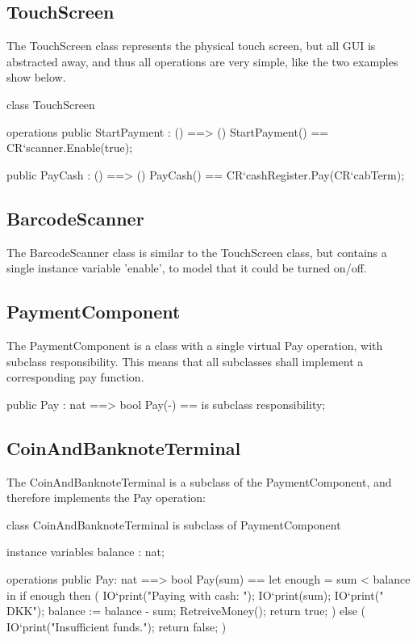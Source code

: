 \subsection{TouchScreen}
The TouchScreen class represents the physical touch screen, but all GUI is abstracted away, and thus all operations are very simple, like the two examples show below.
\begin{vdmpp}
class TouchScreen

operations
 public StartPayment : () ==> ()
 StartPayment() ==
  CR`scanner.Enable(true);

 public PayCash : () ==> ()
 PayCash() ==
  CR`cashRegister.Pay(CR`cabTerm);
 \end{vdmpp}

\subsection{BarcodeScanner}
The BarcodeScanner class is similar to the TouchScreen class, but contains a single instance variable 'enable', to model that it could be turned on/off.


\subsection{PaymentComponent}
The PaymentComponent is a class with a single virtual Pay operation, with subclass responsibility. This means that all subclasses shall implement a corresponding pay function.
\begin{vdmpp}
public Pay : nat ==> bool
Pay(-) == is subclass responsibility;
\end{vdmpp}

\subsection{CoinAndBanknoteTerminal}
The CoinAndBanknoteTerminal is a subclass of the PaymentComponent, and therefore implements the Pay operation:
\begin{vdmpp}
class CoinAndBanknoteTerminal is subclass of PaymentComponent

instance variables
 balance : nat;

operations
 public Pay: nat ==> bool
  Pay(sum) ==
   let enough = sum < balance
      in
    if enough then
    (
     IO`print("Paying with cash: ");
     IO`print(sum);
     IO`print(" DKK\n");
     balance := balance - sum;
     RetreiveMoney();
     return true;
    ) else 
    (  
     IO`print("Insufficient funds.\n");
     return false;
    )
\end{vdmpp}

